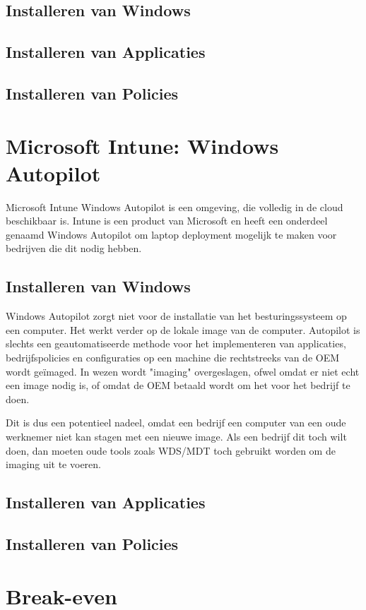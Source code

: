 \subsection{Installeren van Windows}

\subsection{Installeren van Applicaties}

\subsection{Installeren van Policies}




\section{Microsoft Intune: Windows Autopilot}

Microsoft Intune Windows Autopilot is een omgeving, die volledig in de cloud beschikbaar is. Intune is een product van Microsoft en heeft een onderdeel genaamd Windows Autopilot om laptop deployment mogelijk te maken voor bedrijven die dit nodig hebben.

\subsection{Installeren van Windows}

Windows Autopilot zorgt niet voor de installatie van het besturingssysteem op een computer. Het werkt verder op de lokale image van de computer. Autopilot is slechts een geautomatiseerde methode voor het implementeren van applicaties, bedrijfspolicies en configuraties op een machine die rechtstreeks van de OEM wordt geïmaged. In wezen wordt "imaging" overgeslagen, ofwel omdat er niet echt een image nodig is, of omdat de OEM betaald wordt om het voor het bedrijf te doen.

Dit is dus een potentieel nadeel, omdat een bedrijf een computer van een oude werknemer niet kan stagen met een nieuwe image. Als een bedrijf dit toch wilt doen, dan moeten oude tools zoals WDS/MDT toch gebruikt worden om de imaging uit te voeren.

\subsection{Installeren van Applicaties}

\subsection{Installeren van Policies}




\section{Break-even}


